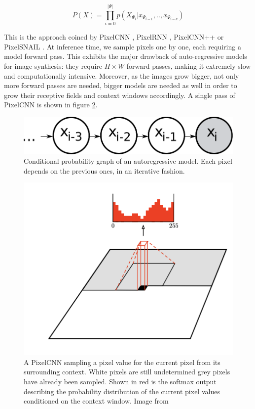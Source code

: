 \begin{equation}
    P(X) = \prod_{i = 0}^{|\Psi|} p(X_{\Psi_i} | x_{\Psi_{i-1}}, .., x_{\Psi_{i-k}})
\end{equation}

This is the approach coined by PixelCNN \citep{pixelcnn}, PixelRNN \citep{pixelrnn}, PixelCNN++ \citep{pixelcnn++} or PixelSNAIL \citep{pixelsnail}. At inference time, we sample pixels one by one, each requiring a model forward pass. This exhibits the major drawback of auto-regressive models for image synthesis: they require $H \times W$ forward passes, making it extremely slow and computationally intensive. Moreover, as the images grow bigger, not only more forward passes are needed, bigger models are needed as well in order to grow their receptive fields and context windows accordingly. A single pass of PixelCNN is shown in figure \ref{fig:pixelcnn}.

\begin{figure}[ht]
    \centering
    \includegraphics[scale=0.5]{60-files/chain-pixelcnn.pdf}
    \caption{Conditional probability graph of an autoregressive model. Each pixel depends on the previous ones, in an iterative fashion.}
    \label{fig:autoreg-chain}
\end{figure}

\begin{figure}[ht]
    \centering
    \includegraphics[scale=0.8]{60-files/pixelcnn.png}
    \caption{A PixelCNN sampling a pixel value for the current pixel from its surrounding context. White pixels are still undetermined grey pixels have already been sampled. Shown in red is the softmax output describing the probability distribution of the current pixel values conditioned on the context window. Image from \citet{pixelcnn}}
    \label{fig:pixelcnn}
\end{figure}


